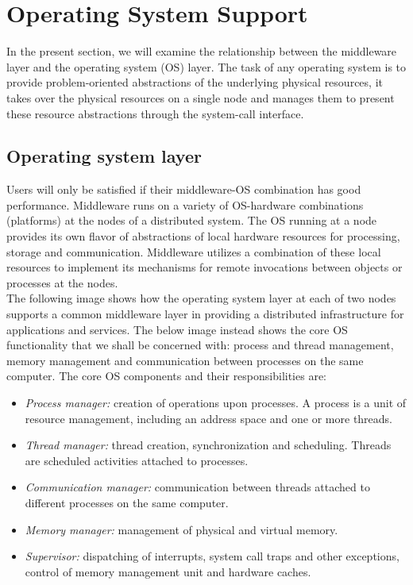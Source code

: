 \section{Operating System Support}
In the present section, we will examine the relationship between the middleware layer and the operating system (OS) layer. The task of any operating system is to provide problem-oriented abstractions of the underlying physical resources, it takes over the physical resources on a single node and manages them to present these resource abstractions through the system-call interface.

\subsection{Operating system layer}
Users will only be satisfied if their middleware-OS combination has good performance. Middleware runs on a variety of OS-hardware combinations (platforms) at the nodes of a distributed system. The OS running at a node provides its own flavor of abstractions of local hardware resources for processing, storage and communication. Middleware utilizes a combination of these local resources to implement its mechanisms for remote invocations between objects or processes at the nodes.\\
The following image shows how the operating system layer at each of two nodes supports a common middleware layer in providing a distributed infrastructure for applications and services.
The below image instead shows the core OS functionality that we shall be concerned with: process and thread management, memory management and communication between processes on the same computer.
The core OS components and their responsibilities are:
\begin{itemize}
	\item \textit{Process manager:} creation of operations upon processes. A process is a unit of resource management, including an address space and one or more threads.
	\item \textit{Thread manager:} thread creation, synchronization and scheduling. Threads are scheduled activities attached to processes.
	\item \textit{Communication manager:} communication between threads attached to different processes on the same computer.
	\item \textit{Memory manager:} management of physical and virtual memory.
	\item \textit{Supervisor:} dispatching of interrupts, system call traps and other exceptions, control of memory management unit and hardware caches.
\end{itemize}

